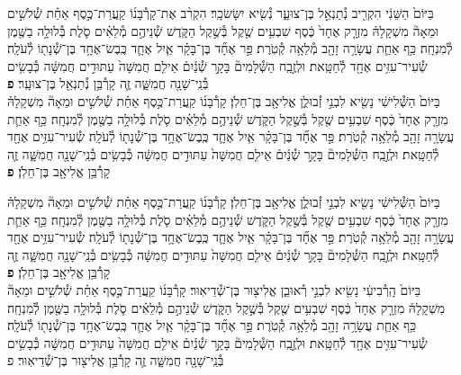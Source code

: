\documentclass[twoside, openany, parskip=half, 11pt]{book}
\begin{document}
\begin{footnotesize}
\begin{multicols}{2}
בַּיּוֹם֙ הַשֵּׁנִ֔י הִקְרִ֖יב נְ֯תַנְאֵ֣ל בֶּן־צוּעָ֑ר נְ֯שִׂ֖יא יִשָּׂשׂכָֽר׃ הִקְרִ֨ב אֶת־קָרְ֯בָּנ֜וֹ קַֽעֲרַת־כֶּ֣סֶף אַחַ֗ת שְׁ֯לֹשִׁ֣ים וּמֵאָה֘ מִשְׁקָלָהּ֒ מִזְרָ֤ק אֶחָד֙ כֶּ֔סֶף שִׁבְעִ֥ים שֶׁ֖קֶל בְּ֯שֶׁ֣קֶל הַקֹּ֑דֶשׁ שְׁ֯נֵיהֶ֣ם מְ֯לֵאִ֗ים סֹ֛לֶת בְּ֯לוּלָ֥ה בַשֶּׁ֖מֶן לְ֯מִנְחָֽה׃ כַּ֥ף אַחַ֛ת עֲשָׂרָ֥ה זָהָ֖ב מְ֯לֵאָ֥ה קְ֯טֹֽרֶת׃  פַּ֣ר אֶחָ֞ד בֶּן־בָּקָ֗ר אַ֧יִל אֶחָ֛ד כֶּֽבֶשׂ־אֶחָ֥ד בֶּן־שְׁ֯נָת֖וֹ לְ֯עֹלָֽה׃ שְׂ֯עִיר־עִזִּ֥ים אֶחָ֖ד לְ֯חַטָּֽאת׃ וּלְזֶ֣בַֽח הַשְּׁ֯לָמִים֘ בָּקָ֣ר שְׁ֯נַ֒יִם֒ אֵילִ֤ם חֲמִשָּׁה֙ עַתּוּדִ֣ים חֲמִשָּׁ֔ה כְּ֯בָשִׂ֥ים בְּ֯נֵֽי־שָׁנָ֖ה חֲמִשָּׁ֑ה זֶ֛ה קָרְ֯בַּ֥ן נְ֯תַנְאֵ֖ל בֶּן־צוּעָֽר׃ \textbf{פ} \\
בַּיּוֹם֙ הַשְּׁ֯לִישִׁ֔י נָשִׂ֖יא לִבְנֵ֣י זְ֯בוּלֻ֑ן אֱלִיאָ֖ב בֶּן־חֵלֹֽן׃ קָרְ֯בָּנ֜וֹ קַֽעֲרַת־כֶּ֣סֶף אַחַ֗ת שְׁ֯לֹשִׁ֣ים וּמֵאָה֘ מִשְׁקָלָהּ֒ מִזְרָ֤ק אֶחָד֙ כֶּ֔סֶף שִׁבְעִ֥ים שֶׁ֖קֶל בְּ֯שֶׁ֣קֶל הַקֹּ֑דֶשׁ שְׁ֯נֵיהֶ֣ם מְ֯לֵאִ֗ים סֹ֛לֶת בְּ֯לוּלָ֥ה בַשֶּׁ֖מֶן לְ֯מִנְחָֽה׃ כַּ֥ף אַחַ֛ת עֲשָׂרָ֥ה זָהָ֖ב מְ֯לֵאָ֥ה קְ֯טֹֽרֶת׃ פַּ֣ר אֶחָ֞ד בֶּן־בָּקָ֗ר אַ֧יִל אֶחָ֛ד כֶּֽבֶשׂ־אֶחָ֥ד בֶּן־שְׁ֯נָת֖וֹ לְ֯עֹלָֽה׃ שְׂ֯עִיר־עִזִּ֥ים אֶחָ֖ד לְ֯חַטָּֽאת׃ וּלְזֶ֣בַֽח הַשְּׁ֯לָמִים֘ בָּקָ֣ר שְׁ֯נַ֒יִם֒ אֵילִ֤ם חֲמִשָּׁה֙ עַתּוּדִ֣ים חֲמִשָּׁ֔ה כְּ֯בָשִׂ֥ים בְּ֯נֵֽי־שָׁנָ֖ה חֲמִשָּׁ֑ה זֶ֛ה קָרְ֯בַּ֥ן אֱלִיאָ֖ב בֶּן־חֵלֹֽן׃ \textbf{פ}


בַּיּוֹם֙ הַשְּׁ֯לִישִׁ֔י נָשִׂ֖יא לִבְנֵ֣י זְ֯בוּלֻ֑ן אֱלִיאָ֖ב בֶּן־חֵלֹֽן׃ קָרְ֯בָּנ֜וֹ קַֽעֲרַת־כֶּ֣סֶף אַחַ֗ת שְׁ֯לֹשִׁ֣ים וּמֵאָה֘ מִשְׁקָלָהּ֒ מִזְרָ֤ק אֶחָד֙ כֶּ֔סֶף שִׁבְעִ֥ים שֶׁ֖קֶל בְּ֯שֶׁ֣קֶל הַקֹּ֑דֶשׁ שְׁ֯נֵיהֶ֣ם מְ֯לֵאִ֗ים סֹ֛לֶת בְּ֯לוּלָ֥ה בַשֶּׁ֖מֶן לְ֯מִנְחָֽה׃ כַּ֥ף אַחַ֛ת עֲשָׂרָ֥ה זָהָ֖ב מְ֯לֵאָ֥ה קְ֯טֹֽרֶת׃  פַּ֣ר אֶחָ֞ד בֶּן־בָּקָ֗ר אַ֧יִל אֶחָ֛ד כֶּֽבֶשׂ־אֶחָ֥ד בֶּן־שְׁ֯נָת֖וֹ לְ֯עֹלָֽה׃ שְׂ֯עִיר־עִזִּ֥ים אֶחָ֖ד לְ֯חַטָּֽאת׃ וּלְזֶ֣בַֽח הַשְּׁ֯לָמִים֘ בָּקָ֣ר שְׁ֯נַ֒יִם֒ אֵילִ֤ם חֲמִשָּׁה֙ עַתּוּדִ֣ים חֲמִשָּׁ֔ה כְּ֯בָשִׂ֥ים בְּ֯נֵֽי־שָׁנָ֖ה חֲמִשָּׁ֑ה זֶ֛ה קָרְ֯בַּ֥ן אֱלִיאָ֖ב בֶּן־חֵלֹֽן׃ \textbf{פ} \\
 בַּיּוֹם֙ הָֽרְ֯בִיעִ֔י נָשִׂ֖יא לִבְנֵ֣י רְ֯אוּבֵ֑ן אֱלִיצ֖וּר בֶּן־שְׁ֯דֵיאֽוּר׃ קָרְ֯בָּנ֜וֹ קַֽעֲרַת־כֶּ֣סֶף אַחַ֗ת שְׁ֯לֹשִׁ֣ים וּמֵאָה֘ מִשְׁקָלָהּ֒ מִזְרָ֤ק אֶחָד֙ כֶּ֔סֶף שִׁבְעִ֥ים שֶׁ֖קֶל בְּ֯שֶׁ֣קֶל הַקֹּ֑דֶשׁ שְׁ֯נֵיהֶ֣ם מְ֯לֵאִ֗ים סֹ֛לֶת בְּ֯לוּלָ֥ה בַשֶּׁ֖מֶן לְ֯מִנְחָֽה׃ כַּ֥ף אַחַ֛ת עֲשָׂרָ֥ה זָהָ֖ב מְ֯לֵאָ֥ה קְ֯טֹֽרֶת׃ פַּ֣ר אֶחָ֞ד בֶּן־בָּקָ֗ר אַ֧יִל אֶחָ֛ד כֶּֽבֶשׂ־אֶחָ֥ד בֶּן־שְׁ֯נָת֖וֹ לְ֯עֹלָֽה׃ שְׂ֯עִיר־עִזִּ֥ים אֶחָ֖ד לְ֯חַטָּֽאת׃ וּלְזֶ֣בַֽח הַשְּׁ֯לָמִים֘ בָּקָ֣ר שְׁ֯נַ֒יִם֒ אֵילִ֤ם חֲמִשָּׁה֙ עַתּוּדִ֣ים חֲמִשָּׁ֔ה כְּ֯בָשִׂ֥ים בְּ֯נֵֽי־שָׁנָ֖ה חֲמִשָּׁ֑ה זֶ֛ה קָרְ֯בַּ֥ן אֱלִיצ֖וּר בֶּן־שְׁ֯דֵיאֽוּר׃ פ


\end{multicols}
\end{footnotesize}
\end{document}
